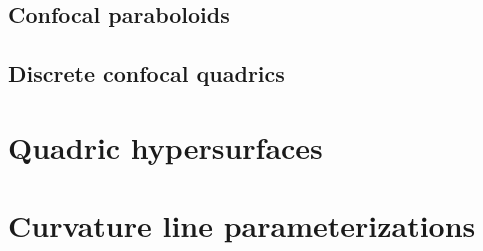 \documentclass[10pt, a4paper]{article}
\theoremstyle{BoldTopSpacing}
\theoremstyle{BoldTopSpacing}
\theoremstyle{BoldTopSpacing}
\theoremstyle{BoldTopBottomSpacing}
\theoremstyle{BoldTopSpacing}
\theoremstyle{BoldTopBottomSpacing}
\theoremstyle{remark}
\begin{document}
\subsection{Confocal paraboloids}
\label{subsec:confocal-paraboloids}
\subsection{Discrete confocal quadrics}
\label{subsec:discrete-confocal-quadrics}
\pagebreak
\appendix
\section{Quadric hypersurfaces}
\label{appendix:quadrics}
\pagebreak
\section{Curvature line parameterizations}
\label{appendix:curvature-lines}
\pagebreak


\pagestyle{tocstyle}


\end{document}
